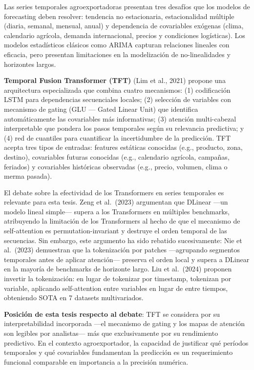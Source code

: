 Las series temporales agroexportadoras presentan tres desafíos que los
modelos de forecasting deben resolver: tendencia no estacionaria,
estacionalidad múltiple (diaria, semanal, mensual, anual) y dependencia
de covariables exógenas (clima, calendario agrícola, demanda
internacional, precios y condiciones logísticas). Los modelos
estadísticos clásicos como ARIMA capturan relaciones lineales con
eficacia, pero presentan limitaciones en la modelización de
no-linealidades y horizontes largos.

\textbf{Temporal Fusion Transformer (TFT)} (Lim et al., 2021) propone
una arquitectura especializada que combina cuatro mecanismos: (1)
codificación LSTM para dependencias secuenciales locales; (2) selección
de variables con mecanismo de gating (GLU --- Gated Linear Unit) que
identifica automáticamente las covariables más informativas; (3)
atención multi-cabezal interpretable que pondera los pasos temporales
según su relevancia predictiva; y (4) red de cuantiles para cuantificar
la incertidumbre de la predicción. TFT acepta tres tipos de entradas:
features estáticas conocidas (e.g., producto, zona, destino),
covariables futuras conocidas (e.g., calendario agrícola, campañas,
feriados) y covariables históricas observadas (e.g., precio, volumen,
clima o merma pasada).

El debate sobre la efectividad de los Transformers en series temporales
es relevante para esta tesis. Zeng et al.~(2023) argumentan que DLinear
---un modelo lineal simple--- supera a los Transformers en múltiples
benchmarks, atribuyendo la limitación de los Transformers al hecho de
que el mecanismo de self-attention es permutation-invariant y destruye
el orden temporal de las secuencias. Sin embargo, este argumento ha sido
rebatido sucesivamente: Nie et al.~(2023) demuestran que la tokenización
por patches ---agrupando segmentos temporales antes de aplicar
atención--- preserva el orden local y supera a DLinear en la mayoría de
benchmarks de horizonte largo. Liu et al.~(2024) proponen invertir la
tokenización: en lugar de tokenizar por timestamp, tokenizan por
variable, aplicando self-attention entre variables en lugar de entre
tiempos, obteniendo SOTA en 7 datasets multivariados.

\textbf{Posición de esta tesis respecto al debate}: TFT se considera por
su interpretabilidad incorporada ---el mecanismo de gating y los mapas
de atención son legibles por analistas--- más que exclusivamente por su
rendimiento predictivo. En el contexto agroexportador, la capacidad de
justificar qué períodos temporales y qué covariables fundamentan la
predicción es un requerimiento funcional comparable en importancia a la
precisión numérica.

